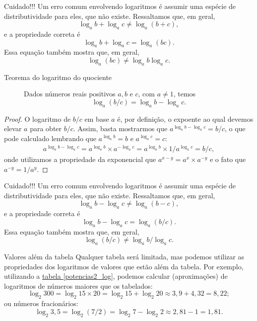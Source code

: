 \begin{observation}{}
Cuidado!!! Um erro comum envolvendo logaritmos é assumir uma espécie de distributividade para eles, que não existe. Ressaltamos que, em geral,
$$
\log_a b + \log_a c \neq \log_a (b +c),
$$
e a propriedade correta é 
$$
\log_a b + \log_a c = \log_a (bc).
$$
Essa equação também mostra que, em geral,
$$
\log_a (bc) \neq \log_a b \log_a c.
$$
\end{observation}


\begin{description}
\item[Teorema do logaritmo do quociente]\label{teo_log_div} 
Dados números reais positivos $a,b$ e $c$, com $a \neq 1$, temos
$$
\log_a(b/c) = \log_a b - \log_a c.
$$
\end{description}
\begin{proof}
O logaritmo de $b/c$ em base $a$ é, por definição, o expoente ao qual devemos elevar $a$ para obter $b/c$. Assim, basta mostrarmos que $a^{\log_a b - \log_a c} =b/c$, o que pode calculado lembrando que $a^{\log_a b}=b$ e $a^{\log_a c}=c$:
\begin{align*}
a^{\log_a b - \log_a c} = a^{\log_a b} \times a^{-\log_a c} = a^{\log_a b} \times 1/ a^{\log_a c}  =b/c,
\end{align*}
onde utilizamos a propriedade da exponencial que $a^{x-y} = a^{x} \times a^{-y}$ e o fato que $a^{-y}=1/a^y$.
\end{proof}


\begin{observation}{}
Cuidado!!! Um erro comum envolvendo logaritmos é assumir uma espécie de distributividade para eles, que não existe. Ressaltamos que, em geral,
$$
\log_a b - \log_a c \neq \log_a (b - c),
$$
e a propriedade correta é 
$$
\log_a b - \log_a c = \log_a (b/c).
$$
Essa equação também mostra que, em geral,
$$
\log_a (b/c) \neq \log_a b/\log_a c.
$$
\end{observation}


\begin{example}{Valores além da tabela}
Qualquer tabela será limitada, mas podemos utilizar as propriedades dos logaritmos de valores que estão além da tabela. Por exemplo, utilizando a \hyperref[potencias2_log]{tabela \ref{potencias2_log}}, podemos calcular (aproximações) de logaritmos de números maiores que os tabelados:
$$
\log_2 300 = \log_2 15 \times 20 = \log_2 15 +\log_2 20 \approx 3{,}9 + 4{,}32 = 8{,}22;
$$
ou números fracionários:
$$
\log_2 3{,}5 = \log_2 (7/2) = \log_2 7 -\log_2 2 \approx 2{,}81 -1 = 1{,}81.
$$
\end{example}

